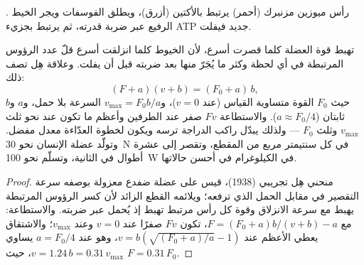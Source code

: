 \begin{omfigure}

{\small {}. رأس ميوزين مزنبرك (أحمر) يرتبط
بالأكتين (أزرق)، ويطلق الفوسفات ويجر الخيط الرفيع عبر
ضربة قدرته، ثم يرتبط بجزيء ATP جديد فيفلت.}
\end{omfigure}

\begin{theorem}\label{thm:b2:muscle-movement:hill}
تهبط قوة العضلة كلما قصرت أسرع، لأن الخيوط كلما
انزلقت أسرع قلّ عدد الرؤوس المرتبطة في أي لحظة
وكثر ما يُجَرّ منها بعد ضربته قبل أن
يفلت. وعلاقة هِل تصف ذلك:
\[
(F + a)(v + b) = (F_0 + a)\,b,
\]
حيث $F_0$ القوة متساوية القياس (عند $v = 0$)، و$v_{\max} =
F_0 b/a$ السرعة بلا حمل، و$a$ و$b$ ثابتان ($a \approx
F_0/4$). والاستطاعة $Fv$ صفر عند الطرفين وأعظم ما تكون عند نحو
ثلث $v_{\max}$ وثلث $F_0$ --- ولذلك يبدّل راكب الدراجة
ترسه ويكون لخطوة العدّاءة معدل مفضل. وتولّد عضلة
الإنسان نحو \qty{30}{N} في كل سنتيمتر مربع من
المقطع، وتقصر إلى عشرة أطوال في الثانية، وتسلّم
نحو \qty{100}{W} في الكيلوغرام في أحسن حالاتها.
\end{theorem}
\begin{proof}
منحني هِل تجريبي (1938)، قيس على عضلة ضفدع معزولة
بوصفه سرعة التقصير في مقابل الحمل الذي ترفعه؛ ويلائمه القطع الزائد
لأن كسر الرؤوس المرتبطة يهبط مع سرعة الانزلاق
وقوة كل رأس مرتبط تهبط إذ يُحمل عبر
ضربته. والاستطاعة: مع $F = (F_0 + a)b/(v + b) - a$، تكون $Fv$ صفرًا عند
$v = 0$ وعند $v_{\max}$؛ والاشتقاق يعطي الأعظم عند
$v = b(\sqrt{(F_0 + a)/a} - 1)$، وهو عند $a = F_0/4$ يساوي $v =
1.24\,b = 0.31\,v_{\max}$، حيث $F = 0.31\,F_0$.
\end{proof}


